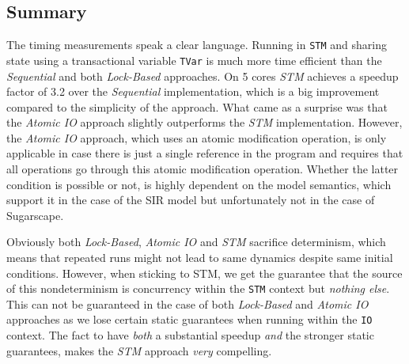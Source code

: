 \subsection{Summary}
The timing measurements speak a clear language. Running in \texttt{STM} and sharing state using a transactional variable \texttt{TVar} is much more time efficient than the \textit{Sequential} and both \textit{Lock-Based} approaches. On 5 cores \textit{STM} achieves a speedup factor of 3.2 over the \textit{Sequential} implementation, which is a big improvement compared to the simplicity of the approach. What came as a surprise was that the \textit{Atomic IO} approach slightly outperforms the \textit{STM} implementation. However, the \textit{Atomic IO} approach, which uses an atomic modification operation, is only applicable in case there is just a single reference in the program and requires that all operations go through this atomic modification operation. Whether the latter condition is possible or not, is highly dependent on the model semantics, which support it in the case of the SIR model but unfortunately not in the case of Sugarscape.

Obviously both \textit{Lock-Based}, \textit{Atomic IO} and \textit{STM} sacrifice determinism, which means that repeated runs might not lead to same dynamics despite same initial conditions. However, when sticking to STM, we get the guarantee that the source of this nondeterminism is concurrency within the \texttt{STM} context but \textit{nothing else}. This can not be guaranteed in the case of both \textit{Lock-Based} and \textit{Atomic IO} approaches as we lose certain static guarantees when running within the \texttt{IO} context. The fact to have \textit{both} a substantial speedup \textit{and} the stronger static guarantees, makes the \textit{STM} approach \textit{very} compelling.
